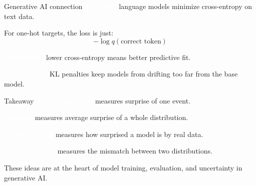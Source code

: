 \documentclass[aspectratio=169]{beamer}
\renewcommand{\textbf}[1]{\textcolor{white}{\bfseries #1}}
\begin{document}
\begin{frame}[c]{Generative AI connection}
\textbf{Training:} language models minimize cross-entropy on text data.

\vspace{0.5em}
For one-hot targets, the loss is just:
\[
-\log q(\text{correct token})
\]

\vspace{0.5em}
\textbf{Evaluation:} lower cross-entropy means better predictive fit.

\vspace{0.5em}
\textbf{Fine-tuning:} KL penalties keep models from drifting too far from the base model.
\end{frame}

\begin{frame}[c]{Takeaway}
\textbf{Self-information} measures surprise of one event.

\textbf{Entropy} measures average surprise of a whole distribution.

\textbf{Cross-entropy} measures how surprised a model is by real data.

\textbf{KL divergence} measures the mismatch between two distributions.

\vspace{0.5em}
These ideas are at the heart of model training, evaluation, and uncertainty in generative AI.
\end{frame}
\end{document}
